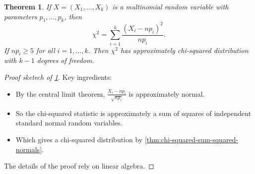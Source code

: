 \documentclass[10pt]{article}
\newtheorem{theorem}{Theorem}
\theoremstyle{definition}
\newcommand{\1}[1]{\textbf{1}_{\left[#1\right]}} %
\begin{document}
\begin{theorem}
  \label{thm:chi-squared-theorem}
  If $X=(X_{1},\ldots,X_{k})$ is a multinomial random variable with
  parameters $p_{1},\ldots,p_{k}$, then 
  \begin{equation*}
    \chi^{2} = \sum_{i=1}^{k} \frac{\left(X_{i}-np_{i}\right)^{2}}{np_{i}}.
  \end{equation*}
  If $np_{i}\geq 5$ for all $i=1,\ldots,k$. Then $\chi^{2}$ has approximately
  chi-squared distribution with $k-1$ degrees of freedom.
\end{theorem}



\begin{proof}[Proof sketech of \cref{thm:chi-squared-theorem}]
  Key ingredients:
  \begin{itemize}
    \item By the central limit theorem, $\frac{X_{i}-np_{i}}{\sqrt{np_{i}}}$
    is approximately normal.
    \item So the chi-squared statistic is approximately a sum of squares of
    independent standard normal random variables.
    \item Which gives a chi-squared distribution by
    \cref{thm:chi-squared-sum-squared-normals}.
  \end{itemize}
  The details of the proof rely on linear algebra.
\end{proof}
\end{document}
